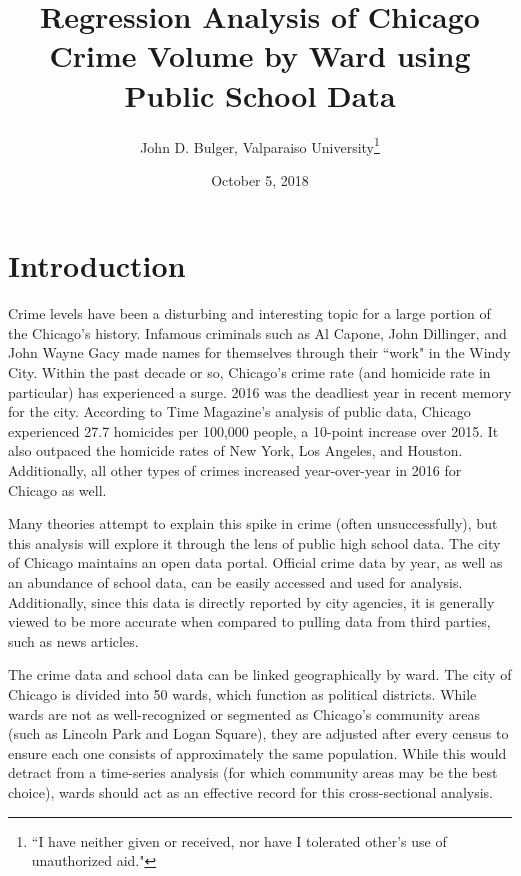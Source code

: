 \documentclass[12pt]{article}
\title{Regression Analysis of Chicago Crime Volume by Ward using Public School Data}
\author{John D. Bulger, Valparaiso University\thanks{``I have neither given or received, nor have I tolerated other’s use of unauthorized aid."}}
\date{October 5, 2018}
\begin{document}
	\maketitle

	\section{Introduction}
	
Crime levels have been a disturbing and interesting topic for a large portion of the Chicago's history.  Infamous criminals such as Al Capone, John Dillinger, and John Wayne Gacy made names for themselves through their ``work" in the Windy City.  Within the past decade or so, Chicago’s crime rate (and homicide rate in particular) has experienced a surge.  2016 was the deadliest year in recent memory for the city.  According to Time Magazine's analysis of public data, Chicago experienced 27.7 homicides per 100,000 people, a 10-point increase over 2015.  It also outpaced the homicide rates of New York, Los Angeles, and Houston.  Additionally, all other types of crimes increased year-over-year in 2016 for Chicago as well.\cite{sanburn}

\par

Many theories attempt to explain this spike in crime (often unsuccessfully), but this analysis will explore it through the lens of public high school data.  The city of Chicago maintains an open data portal.  Official crime data by year, as well as an abundance of school data, can be easily accessed and used for analysis.  Additionally, since this data is directly reported by city agencies, it is generally viewed to be more accurate when compared to pulling data from third parties, such as news articles.

\par

The crime data and school data can be linked geographically by ward.  The city of Chicago is divided into 50 wards, which function as political districts.  While wards are not as well-recognized or segmented as Chicago’s community areas (such as Lincoln Park and Logan Square), they are adjusted after every census to ensure each one consists of approximately the same population.  While this would detract from a time-series analysis (for which community areas may be the best choice), wards should act as an effective record for this cross-sectional analysis.

\par
\end{document}
